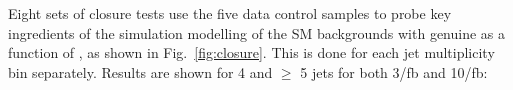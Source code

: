 Eight sets of closure tests use the five data control samples to
probe key ingredients of the simulation modelling of the SM
backgrounds with genuine \met as a function of \scalht, as shown in
Fig.~\ref{fig:closure}. This is done for each jet multiplicity bin
separately. Results are shown for 4 and $\geq$ 5 jets for both 3/fb and 10/fb: 
\begin{figure}[h!]
  \begin{center}
     ~~
     \\
     ~~

\end{center}
\end{figure}
